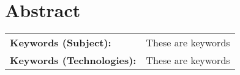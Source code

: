 
\section*{Abstract}


\begin{table}[ht]
\begin{tabular}{ll}
\textbf{Keywords (Subject):}      & These are keywords \\
\textbf{Keywords (Technologies):} & These are keywords
\end{tabular}
\end{table}